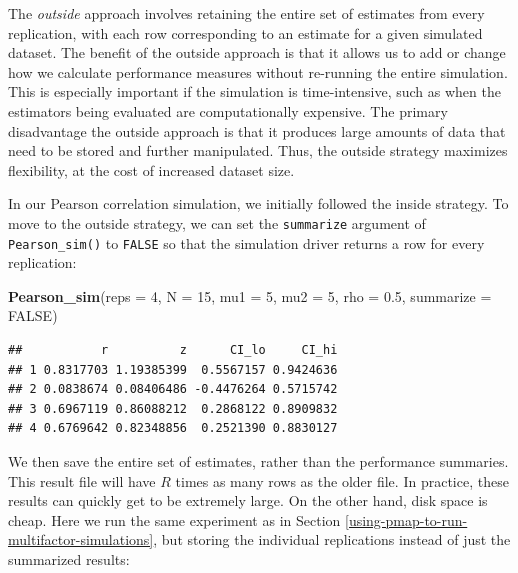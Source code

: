 \documentclass[
]{book}
\newenvironment{Shaded}{\begin{snugshade}}{\end{snugshade}}
\newcommand{\AttributeTok}[1]{\textcolor[rgb]{0.13,0.29,0.53}{#1}}
\newcommand{\ConstantTok}[1]{\textcolor[rgb]{0.56,0.35,0.01}{#1}}
\newcommand{\DecValTok}[1]{\textcolor[rgb]{0.00,0.00,0.81}{#1}}
\newcommand{\FloatTok}[1]{\textcolor[rgb]{0.00,0.00,0.81}{#1}}
\newcommand{\FunctionTok}[1]{\textcolor[rgb]{0.13,0.29,0.53}{\textbf{#1}}}
\newcommand{\NormalTok}[1]{#1}
\begin{document}
The \emph{outside} approach involves retaining the entire set of estimates from every replication, with each row corresponding to an estimate for a given simulated dataset.
The benefit of the outside approach is that it allows us to add or change how we calculate performance measures without re-running the entire simulation.
This is especially important if the simulation is time-intensive, such as when the estimators being evaluated are computationally expensive.
The primary disadvantage the outside approach is that it produces large amounts of data that need to be stored and further manipulated.
Thus, the outside strategy maximizes flexibility, at the cost of increased dataset size.

In our Pearson correlation simulation, we initially followed the inside strategy. To move to the outside strategy, we can set the \texttt{summarize} argument of \texttt{Pearson\_sim()} to \texttt{FALSE} so that the simulation driver returns a row for every replication:

\begin{Shaded}
\begin{Highlighting}[]
\FunctionTok{Pearson\_sim}\NormalTok{(}\AttributeTok{reps =} \DecValTok{4}\NormalTok{, }\AttributeTok{N =} \DecValTok{15}\NormalTok{, }\AttributeTok{mu1 =} \DecValTok{5}\NormalTok{, }\AttributeTok{mu2 =} \DecValTok{5}\NormalTok{, }\AttributeTok{rho =} \FloatTok{0.5}\NormalTok{, }\AttributeTok{summarize =} \ConstantTok{FALSE}\NormalTok{)}
\end{Highlighting}
\end{Shaded}

\begin{verbatim}
##           r          z      CI_lo     CI_hi
## 1 0.8317703 1.19385399  0.5567157 0.9424636
## 2 0.0838674 0.08406486 -0.4476264 0.5715742
## 3 0.6967119 0.86088212  0.2868122 0.8909832
## 4 0.6769642 0.82348856  0.2521390 0.8830127
\end{verbatim}

We then save the entire set of estimates, rather than the performance summaries.
This result file will have \(R\) times as many rows as the older file. In practice, these results can quickly get to be extremely large.
On the other hand, disk space is cheap.
Here we run the same experiment as in Section \ref{using-pmap-to-run-multifactor-simulations}, but storing the individual replications instead of just the summarized results:
\end{document}
